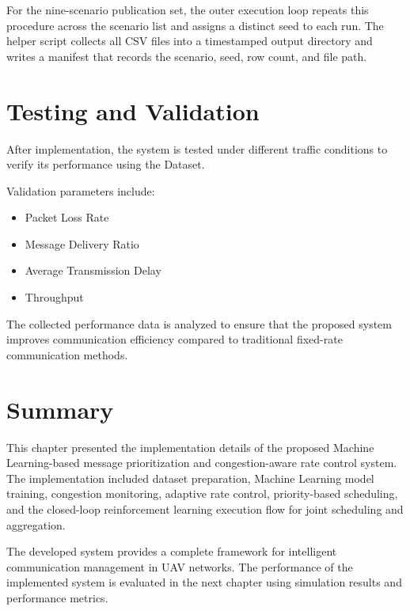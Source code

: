 For the nine-scenario publication set, the outer execution loop repeats this
procedure across the scenario list and assigns a distinct seed to each run.
The helper script collects all CSV files into a timestamped output directory and
writes a manifest that records the scenario, seed, row count, and file path.


\section{Testing and Validation}

After implementation, the system is tested under 
different traffic conditions to verify its performance using the Dataset.

Validation parameters include:

\begin{itemize}

\item Packet Loss Rate

\item Message Delivery Ratio

\item Average Transmission Delay

\item Throughput

\end{itemize}

The collected performance data is analyzed to ensure 
that the proposed system improves communication 
efficiency compared to traditional fixed-rate 
communication methods.


\section{Summary}

This chapter presented the implementation details of 
the proposed Machine Learning-based message 
prioritization and congestion-aware rate control 
system. The implementation included dataset preparation, 
Machine Learning model training, congestion monitoring, 
adaptive rate control, priority-based scheduling, and the 
closed-loop reinforcement learning execution flow for joint 
scheduling and aggregation.

The developed system provides a complete framework for 
intelligent communication management in UAV networks. 
The performance of the implemented system is evaluated 
in the next chapter using simulation results and 
performance metrics.